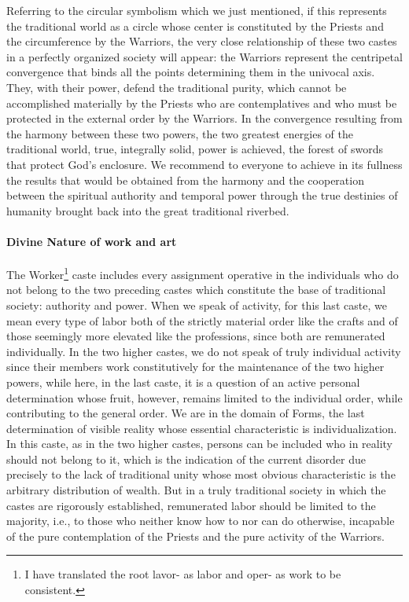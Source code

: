 Referring to the circular symbolism which we just mentioned, if this represents the traditional world as a circle whose center is constituted by the Priests and the circumference by the Warriors, the very close relationship of these two castes in a perfectly organized society will appear: the Warriors represent the centripetal convergence that binds all the points determining them in the univocal axis. They, with their power, defend the traditional purity, which cannot be accomplished materially by the Priests who are contemplatives and who must be protected in the external order by the Warriors. In the convergence resulting from the harmony between these two powers, the two greatest energies of the traditional world, true, integrally solid, power is achieved, the forest of swords that protect God's enclosure. We recommend to everyone to achieve in its fullness the results that would be obtained from the harmony and the cooperation between the spiritual authority and temporal power through the true destinies of humanity brought back into the great traditional riverbed.

\paragraph{Divine Nature of work and art}

The Worker\footnote{I have translated the root lavor- as labor and oper- as work to be consistent.} caste includes every assignment operative in the individuals who do not belong to the two preceding castes which constitute the base of traditional society: authority and power. When we speak of activity, for this last caste, we mean every type of labor both of the strictly material order like the crafts and of those seemingly more elevated like the professions, since both are remunerated individually. In the two higher castes, we do not speak of truly individual activity since their members work constitutively for the maintenance of the two higher powers, while here, in the last caste, it is a question of an active personal determination whose fruit, however, remains limited to the individual order, while contributing to the general order. We are in the domain of Forms, the last determination of visible reality whose essential characteristic is individualization. In this caste, as in the two higher castes, persons can be included who in reality should not belong to it, which is the indication of the current disorder due precisely to the lack of traditional unity whose most obvious characteristic is the arbitrary distribution of wealth. But in a truly traditional society in which the castes are rigorously established, remunerated labor should be limited to the majority, i.e., to those who neither know how to nor can do otherwise, incapable of the pure contemplation of the Priests and the pure activity of the Warriors.

